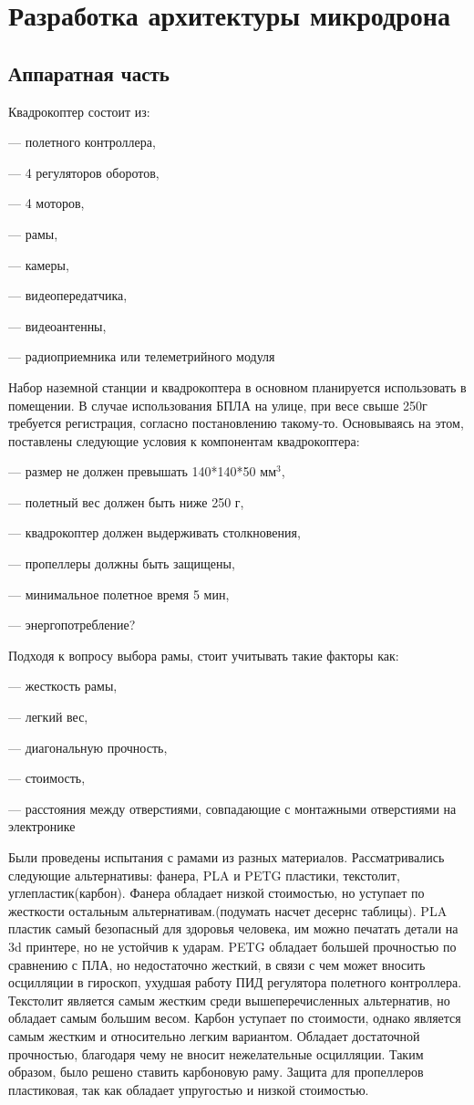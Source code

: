 
\section{Разработка архитектуры микродрона}
\subsection{Аппаратная часть}

Квадрокоптер состоит из:

--- полетного контроллера,

--- 4 регуляторов оборотов,

--- 4 моторов,

--- рамы,

--- камеры,

--- видеопередатчика,

--- видеоантенны,

--- радиоприемника или телеметрийного модуля

Набор наземной станции и квадрокоптера в основном планируется использовать в помещении. В случае использования БПЛА на улице, при весе свыше 250г требуется регистрация, согласно постановлению такому-то. Основываясь на этом, поставлены следующие условия к компонентам квадрокоптера:

--- размер не должен превышать 140*140*50 \(мм^3\),

--- полетный вес должен быть ниже 250 г,

--- квадрокоптер должен выдерживать столкновения,

--- пропеллеры должны быть защищены,

--- минимальное полетное время 5 мин,

--- энергопотребление?

Подходя к вопросу выбора рамы, стоит учитывать такие факторы как:

--- жесткость рамы,

--- легкий вес,

--- диагональную прочность,

--- стоимость,

--- расстояния между отверстиями, совпадающие с монтажными отверстиями на электронике

Были проведены испытания с рамами из разных материалов. Рассматривались следующие альтернативы: фанера, PLA и PETG пластики, текстолит, углепластик(карбон). Фанера обладает низкой стоимостью, но уступает по жесткости остальным альтернативам.(подумать насчет десернс таблицы). PLA пластик самый безопасный для здоровья человека, им можно печатать детали на 3d принтере, но не устойчив к ударам. PETG обладает большей прочностью по сравнению с ПЛА, но недостаточно жесткий, в связи с чем может вносить осцилляции в гироскоп, ухудшая работу ПИД регулятора полетного контроллера. Текстолит является самым жестким среди вышеперечисленных альтернатив, но обладает самым большим весом. Карбон уступает по стоимости, однако является самым жестким и относительно легким вариантом. Обладает достаточной прочностью, благодаря чему не вносит нежелательные осцилляции. Таким образом, было решено ставить карбоновую раму.
Защита для пропеллеров пластиковая, так как обладает упругостью и низкой стоимостью.

